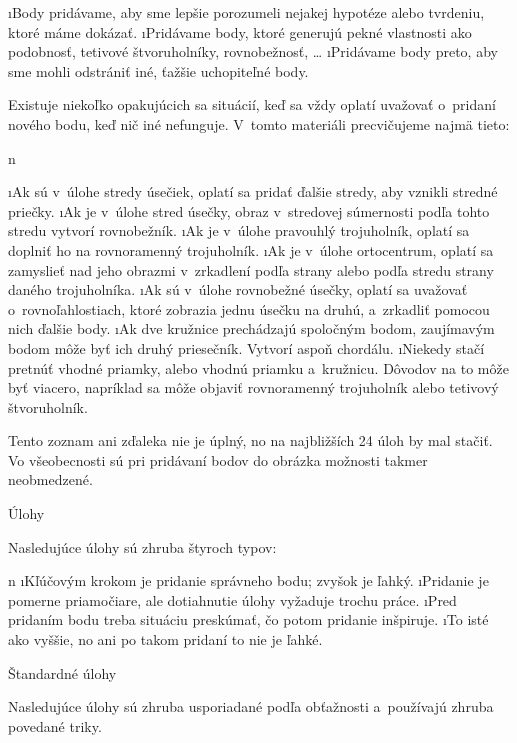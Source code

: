 \begitems
\i Body pridávame, aby sme lepšie porozumeli nejakej hypotéze alebo tvrdeniu, ktoré máme dokázať.
\i Pridávame body, ktoré generujú pekné vlastnosti ako podobnosť, tetivové štvoruholníky, rovnobežnosť, \dots
\i Pridávame body preto, aby sme mohli odstrániť iné, ťažšie uchopiteľné body.
\enditems

Existuje niekoľko opakujúcich sa situácií, keď sa vždy oplatí uvažovať o~pridaní nového bodu, keď nič iné nefunguje. V~tomto materiáli precvičujeme najmä tieto:

\begitems \style n

\i Ak sú v~úlohe stredy úsečiek, oplatí sa pridať ďalšie stredy, aby vznikli stredné priečky.
\i Ak je v~úlohe stred úsečky, obraz v~stredovej súmernosti podľa tohto stredu vytvorí rovnobežník.
\i Ak je v~úlohe pravouhlý trojuholník, oplatí sa doplniť ho na rovnoramenný trojuholník.
\i Ak je v~úlohe ortocentrum, oplatí sa zamyslieť nad jeho obrazmi v~zrkadlení podľa strany alebo podľa stredu strany daného trojuholníka.
\i Ak sú v~úlohe rovnobežné úsečky, oplatí sa uvažovať o~rovnoľahlostiach, ktoré zobrazia jednu úsečku na druhú, a~zrkadliť pomocou nich ďalšie body.
\i Ak dve kružnice prechádzajú spoločným bodom, zaujímavým bodom môže byť ich druhý priesečník. Vytvorí aspoň chordálu.
\i Niekedy stačí pretnúť vhodné priamky, alebo vhodnú priamku a~kružnicu. Dôvodov na to môže byť viacero, napríklad sa môže objaviť rovnoramenný trojuholník alebo tetivový štvoruholník.

\enditems

Tento zoznam ani zďaleka nie je úplný, no na najbližších 24 úloh by mal stačiť. Vo všeobecnosti sú pri pridávaní bodov do obrázka možnosti takmer neobmedzené.

\sec Úlohy

Nasledujúce úlohy sú zhruba štyroch typov:

\begitems \style n
\i Kľúčovým krokom je pridanie správneho bodu; zvyšok je ľahký.
\i Pridanie je pomerne priamočiare, ale dotiahnutie úlohy vyžaduje trochu práce.
\i Pred pridaním bodu treba situáciu preskúmať, čo potom pridanie inšpiruje.
\i To isté ako vyššie, no ani po takom pridaní to nie je ľahké.
\enditems

\secc Štandardné úlohy

Nasledujúce úlohy sú zhruba usporiadané podľa obťažnosti a~používajú zhruba povedané  triky.


